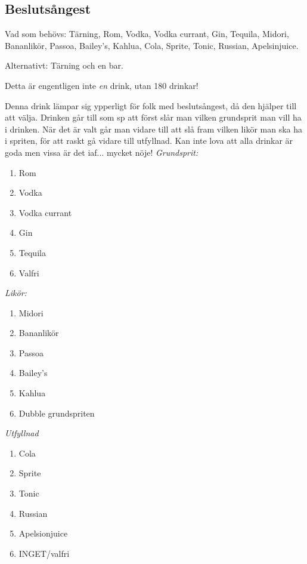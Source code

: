 

\pagestyle{Drinktips}


\filbreak
\subsection{\textbf{Beslutsångest}}

Vad som behövs: Tärning, Rom, Vodka, Vodka currant, Gin, Tequila, Midori, Bananlikör, Passoa, Bailey's, Kahlua, Cola, Sprite, Tonic, Russian, Apelsinjuice.

Alternativt: Tärning och en bar.

Detta är engentligen inte \emph{en} drink, utan 180 drinkar!

Denna drink lämpar sig ypperligt för folk med beslutsångest, då den hjälper till att välja. Drinken går till som sp att först slår man vilken grundsprit man vill ha i drinken. När det är valt går man vidare till att slå fram vilken likör man ska ha i spriten, för att raskt gå vidare till utfyllnad. Kan inte lova att alla drinkar är goda men vissa är det iaf... mycket nöje!
\filbreak
\emph{Grundsprit:}
\begin{enumerate}
    \item Rom
    \item Vodka
    \item Vodka currant
    \item Gin
    \item Tequila
    \item Valfri
\end{enumerate}
\filbreak
\emph{Likör:}
\begin{enumerate}
    \item Midori
    \item Bananlikör
    \item Passoa
    \item Bailey's
    \item Kahlua
    \item Dubble grundspriten
\end{enumerate}
\filbreak
\emph{Utfyllnad}
\begin{enumerate}
    \item Cola
    \item Sprite
    \item Tonic
    \item Russian
    \item Apelsionjuice
    \item INGET/valfri
\end{enumerate}
\filbreak
